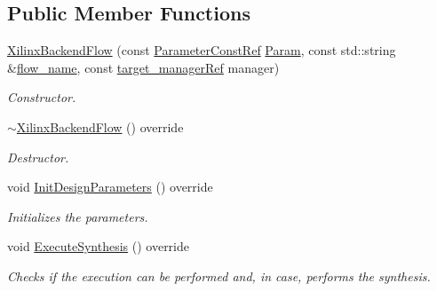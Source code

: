 \subsection*{Public Member Functions}
\begin{DoxyCompactItemize}
\item 
\hyperlink{classXilinxBackendFlow_af4ee34fb087640152ee3e79f7153b0ab}{Xilinx\+Backend\+Flow} (const \hyperlink{Parameter_8hpp_a37841774a6fcb479b597fdf8955eb4ea}{Parameter\+Const\+Ref} \hyperlink{classBackendFlow_a7d21e7cf0afc64b13e0009c9e351873d}{Param}, const std\+::string \&\hyperlink{classBackendFlow_acb230ccab7e32cf0a88811097ff8c3f8}{flow\+\_\+name}, const \hyperlink{target__manager_8hpp_aee0b586a84fb6eb4faefa6e41e1735a9}{target\+\_\+manager\+Ref} manager)
\begin{DoxyCompactList}\small\item\em Constructor. \end{DoxyCompactList}\item 
\hyperlink{classXilinxBackendFlow_ab9993332094e8d1090c00ba110fe82e1}{$\sim$\+Xilinx\+Backend\+Flow} () override
\begin{DoxyCompactList}\small\item\em Destructor. \end{DoxyCompactList}\item 
void \hyperlink{classXilinxBackendFlow_a60d2b3155b8efbcba6ccf49d543751ea}{Init\+Design\+Parameters} () override
\begin{DoxyCompactList}\small\item\em Initializes the parameters. \end{DoxyCompactList}\item 
void \hyperlink{classXilinxBackendFlow_a006b64153e4e8498948c37522fc24b0f}{Execute\+Synthesis} () override
\begin{DoxyCompactList}\small\item\em Checks if the execution can be performed and, in case, performs the synthesis. \end{DoxyCompactList}\end{DoxyCompactItemize}
